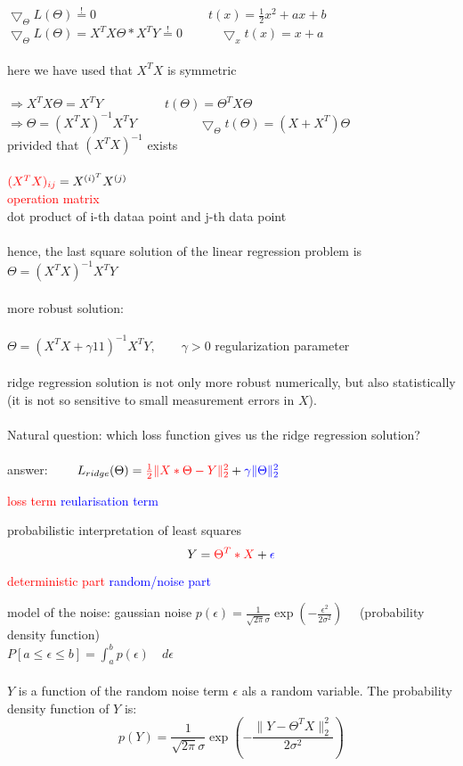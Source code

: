 $\bigtriangledown_{\Theta} L(\Theta) \stackrel{!}{=} 0 \quad\quad\quad\quad\quad\quad\quad\quad\quad  t(x) = \frac{1}{2}x^2+ax+b$\\
$\bigtriangledown_{\Theta} L(\Theta) = X^T X \Theta * X^T Y \stackrel{!}{=} 0  \quad\quad\quad \bigtriangledown_x t(x) = x+a$\\\\
here we have used that $X^T X$ is symmetric\\\\
$\Rightarrow X^T X \Theta = X^T Y \quad\quad\quad\quad\quad t(\Theta) = \Theta^T X \Theta$\\
$\Rightarrow  \Theta = (X^T X)^{-1} X^T Y \quad\quad\quad\quad\quad \bigtriangledown_{\Theta} t(\Theta) = (X+X^T)\Theta$\\
privided that $(X^T X)^{-1}$ exists\\\\
$\textcolor{red}{(X^T X)_{ij}} = X^{(i)^T}X^{(j)}$\\
\textcolor{red}{operation matrix}\\
dot product of i-th dataa point and j-th data point\\\\
hence, the last square solution of the linear regression problem is $\Theta = (X^T X)^{-1} X^T Y$\\\\
more robust solution:\\\\
$\Theta = (X^T X + \gamma 11)^{-1} X^T Y, \quad\quad \gamma > 0$ regularization parameter\\\\
ridge regression solution is not only more robust numerically, but also statistically (it is not so sensitive to small measurement errors in $X$).\\\\
Natural question: which loss function gives us the ridge regression solution?\\\\
answer: $\quad\quad L_{ridge} (\Theta)= \textcolor{red}{\frac{1}{2} \lVert X * \Theta - Y \lVert_2^2} + \textcolor{blue}{\gamma \lVert \Theta \lVert_2^2}$
\begin{center}
\textcolor{red}{loss term} \space\space \textcolor{blue}{reularisation term}
\end{center}
probabilistic interpretation of least squares
\[ Y = \textcolor{red}{\Theta^T * X} + \textcolor{blue}{\epsilon} \]
\begin{center}
\textcolor{red}{deterministic part} \space\space \textcolor{blue}{random/noise part}
\end{center}
model of the noise: gaussian noise \space\space $p(\epsilon)= \frac{1}{\sqrt{2\pi}\sigma} \exp (- \frac{\epsilon^2}{2 \sigma^2}) \quad$ (probability density function)\\
$P[a \leq \epsilon \leq b] = \int_a^b p(\epsilon)\quad d\epsilon$\\\\
$Y$ is a function of the random noise term $\epsilon$ als a random variable. The probability density function of $Y$ is:
\[ p(Y) = \frac{1}{\sqrt{2 \pi}\sigma} \exp(- \frac{\lVert Y - \Theta^T X \lVert^2_2}{2 \sigma^2})\]
